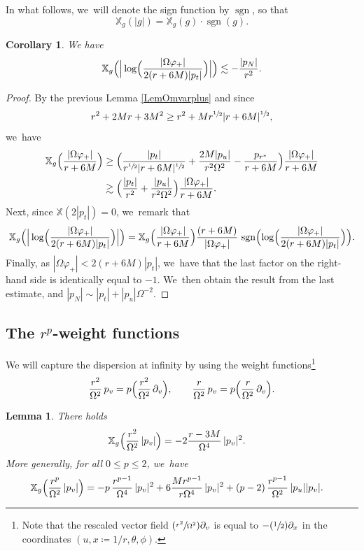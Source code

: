 \documentclass[10pt]{amsart}
\newcommand{\Psfrac}[2]{(\sfrac{#1}{#2})}
\DeclareMathOperator{\sgn}{sgn}
\theoremstyle{plain}
\newtheorem{lemma}[proposition]{Lemma}
\newtheorem{corollary}[proposition]{Corollary}
\theoremstyle{definition}
\newcommand\T{{\mathbb{X}}}
\begin{document}
In what follows, we~will denote the sign function by $\sgn$, so that
\[\T_g(|g|)=\T_g(g) \cdot \sgn(g).\]

\begin{corollary}\label{Corlogvarphiplus}
We have
\[
\T_g \Bigl(\Big|\log \Bigl(\frac{|\Omega\varphi_+|}{2(r+6M)|p_t|} \Bigr) \Big| \Bigr) \lesssim- \frac{|p_N|}{r^2}.
\]
\end{corollary}

\begin{proof}
By the previous Lemma \ref{LemOmvarplus} and since
\[
r^2+2Mr+3M^2 \geq r^2+Mr^{\sfrac{1}{2}}|r+6M|^{\sfrac{1}{2}},
\]
we~have
\begin{align*}
\T_g \Bigl(\frac{|\Omega\varphi_+|}{r+6M} \Bigr) & \geq \Bigl(\frac{|p_t|}{r^{\sfrac{1}{2}}|r+6M|^{\sfrac{1}{2}} }+\frac{2M|p_u|}{r^2 \Omega^2}-\frac{p_{r^*}}{r+6M} \Bigr) \frac{|\Omega\varphi_+|}{r+6M} \\
& \gtrsim \Bigl(\frac{|p_t|}{r^2}+\frac{|p_u|}{r^2 \Omega^2} \Bigr) \frac{|\Omega\varphi_+|}{r+6M}.
\end{align*}
Next, since $\T(2|p_t|)=0$, we~remark that
\[
\T_g \Bigl(\Big|\log \Bigl(\frac{|\Omega\varphi_+|}{2(r+6M)|p_t|} \Bigr) \Big| \Bigr) = \T_g \Bigl(\frac{|\Omega\varphi_+|}{r+6M} \Bigr) \frac{(r+6M)}{|\Omega\varphi_+|}\, \sgn \Bigl(\log \Bigl(\frac{|\Omega\varphi_+|}{2(r+6M)|p_t|} \Bigr) \Bigr).
\]
Finally, as $ |\Omega \varphi_+| < 2 (r+6M)|p_t|$, we~have that the last factor on the right-hand side is identically equal to $-1$. We~then obtain the result from the last estimate, and $|p_N| \sim |p_t| +|p_u|\Omega^{-2}$.
\end{proof}

\subsection{The $r^p$-weight functions}

We will capture the dispersion at infinity by using the weight functions\footnote{Note that the rescaled vector field $\Psfrac{r^2}{\Omega^2}\partial_v$ is equal to $-\Psfrac{1}{2}\partial_x$ in the coordinates $(u, x\coloneqq1/r,\theta,\phi)$.}
\[
\frac{r^2}{\Omega^2}\,p_v=p\Bigl(\frac{r^2}{\Omega^2}\,\partial_v\Bigr), \qquad \frac{r}{\Omega^2}\,p_v=p\Bigl(\frac{r}{\Omega^2}\,\partial_v\Bigr).
\]

\begin{lemma}\label{Lemrp}
There holds
\begin{align*}
\T_g \Bigl(\frac{r^2}{\Omega^2}\, |p_v| \Bigr) & = -2\frac{r-3M}{\Omega^4}\,|p_v|^2.
\end{align*}
More generally, for all $0 \leq p \leq 2$, we~have
\begin{align*}
\T_g \Bigl(\frac{r^p}{\Omega^2}\, |p_v| \Bigr) & = -p\,\frac{r^{p-1}}{\Omega^4}\,|p_v|^2+6\frac{Mr^{p-1}}{r\Omega^4}\,|p_v|^2+(p-2)\,\frac{r^{p-1}}{\Omega^2}\,|p_u ||p_v|.
\end{align*}
\end{lemma}
\end{document}
